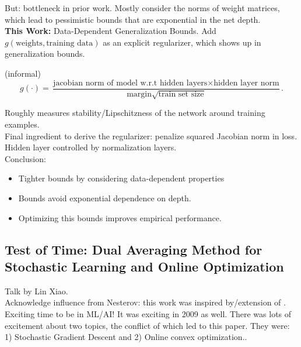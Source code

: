 But: bottleneck in prior work. Mostly consider the norms of weight matrices, which lead to pessimistic bounds that are exponential in the net depth. \\

{\bf This Work:} Data-Dependent Generalization Bounds. Add $g(\text{weights}, \text{training data})$ as an explicit regularizer, which shows up in generalization bounds. \\

\begin{theorem}
(informal)
\begin{equation}
    g(\cdot) = \frac{\text{jacobian norm of model w.r.t hidden layers} \times {\text{hidden layer norm}}}{\text{margin} \sqrt{\text{train set size}}}.
\end{equation}
\end{theorem}

Roughly measures stability/Lipschitzness of the network around training examples. \\

Final ingredient to derive the regularizer: penalize squared Jacobian norm in loss. Hidden layer controlled by normalization layers. \\

Conclusion:
\begin{itemize}
    \item Tighter bounds by considering data-dependent properties
    \item Bounds avoid exponential dependence on depth.
    \item Optimizing this bounds improves empirical performance.
\end{itemize}

\spacerule

\subsection{Test of Time: Dual Averaging Method for Stochastic Learning and Online Optimization \cite{xiao2010dual}}

Talk by Lin Xiao. \\

Acknowledge influence from Nesterov: this work was inspired by/extension of \citet{nesterov2009primal}. \\

Exciting time to be in ML/AI! It was exciting in 2009 as well. There was lots of excitement about two topics, the conflict of which led to this paper. They were: 1) Stochastic Gradient Descent and 2) Online convex optimization.. \\

